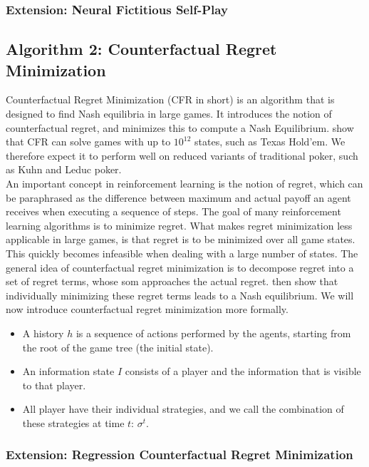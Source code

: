 \documentclass[10pt,a4paper]{article}
\begin{document}
\subsubsection{Extension: Neural Fictitious Self-Play}
\subsection{Algorithm 2: Counterfactual Regret Minimization}
Counterfactual Regret Minimization (CFR in short) is an algorithm that is designed to find Nash equilibria in large games. It introduces the notion of counterfactual regret, and minimizes this to compute a Nash Equilibrium. \citeauthor{cfr} \citep{cfr} show that CFR can solve games with up to $10^{12}$ states, such as Texas Hold'em. We therefore expect it to perform well on reduced variants of traditional poker, such as Kuhn and Leduc poker.\\

An important concept in reinforcement learning is the notion of regret, which can be paraphrased as the difference between maximum and actual payoff an agent receives when executing a sequence of steps. The goal of many reinforcement learning algorithms is to minimize regret. What makes regret minimization less applicable in large games, is that regret is to be minimized over all game states. This quickly becomes infeasible when dealing with a large number of states. The general idea of counterfactual regret minimization is to decompose regret into a set of regret terms, whose som approaches the actual regret. \citeauthor{cfr} then show that individually minimizing these regret terms leads to a Nash equilibrium. We will now introduce counterfactual regret minimization more formally.\\

\begin{itemize}
\item{A history $h$ is a sequence of actions performed by the agents, starting from the root of the game tree (the initial state). }
\item{An information state $I$ consists of a player and the information that is visible to that player.}
\item{All player have their individual strategies, and we call the combination of these strategies at time $t$: $\sigma^t$.}


\end{itemize}

\subsubsection{Extension: Regression Counterfactual Regret Minimization}
\end{document}
